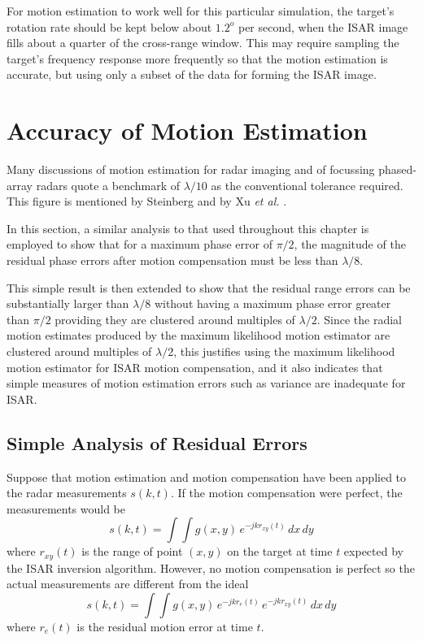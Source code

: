 For motion estimation to work well for this particular simulation, the 
target's rotation rate should be kept below about $1.2^o$ per second, when
the ISAR image fills about a quarter of the cross-range window.  This may
require sampling the target's frequency response more frequently so that the 
motion estimation is accurate, but using only a subset of the data for
forming the ISAR image.


\section{Accuracy of Motion Estimation}
\label{rmc sec:ma}

Many discussions of motion estimation for radar imaging and of focussing
phased-array radars quote a benchmark of $\lambda/10$ as the conventional
tolerance required.  This figure is mentioned by Steinberg
\cite{Tah76} and by Xu {\em et al.\/} \cite{Xu89,Xu90a,Xu90b}.

In this section, a similar analysis to that used throughout this chapter is
employed to show that for a maximum phase error of $\pi/2$, the magnitude of
the residual phase errors after motion compensation must be less than
$\lambda/8$.

This simple result is then extended to show that the residual range errors 
can be substantially larger than $\lambda/8$ without having a maximum phase
error greater than $\pi/2$ providing they are clustered
around multiples of $\lambda/2$.  Since the radial motion estimates produced
by the maximum likelihood motion estimator are clustered around multiples of
$\lambda/2$, this justifies using the maximum likelihood motion estimator
for ISAR motion compensation,  and it also indicates that simple measures of
motion estimation errors such as variance are inadequate for ISAR.

\subsection{Simple Analysis of Residual Errors}

Suppose that motion estimation and motion compensation have been applied to
the radar measurements $s(k,t)$.  If the motion compensation were perfect,
the measurements would be
\begin{equation}
s(k,t)=\int\!\!\int g(x,y)\,e^{-jkr_{xy}(t)}\,dx\,dy
\end{equation}
where $r_{xy}(t)$ is the range of point $(x,y)$ on the target at time $t$
expected by the ISAR inversion algorithm.  However, no motion compensation
is perfect so the actual measurements are different from the ideal 
\begin{equation}
s(k,t)=\int\!\!\int g(x,y)\,e^{-jkr_e(t)}\,e^{-jkr_{xy}(t)}\,dx\,dy
\end{equation}
where $r_e(t)$ is the residual motion error at time $t$.

